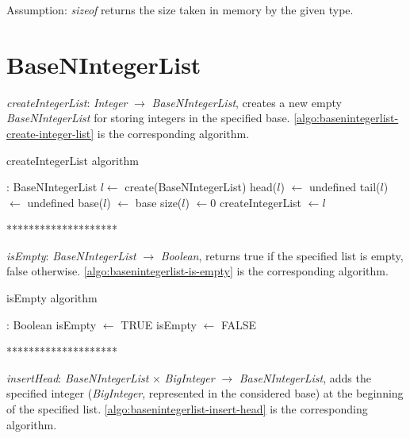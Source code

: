 \documentclass[book, nodocumentinfo]{upmethodology-document}
\newcommand{\separator}{\centerline{********************}}
\begin{document}
Assumption: \emph{sizeof} returns the size taken in memory by the given type.

\section{BaseNIntegerList}

\emph{createIntegerList}: \emph{Integer} \(\rightarrow\) \emph{BaseNIntegerList},
    creates a new empty \emph{BaseNIntegerList} for storing integers in the specified base.
    \ref{algo:basenintegerlist-create-integer-list} is the corresponding algorithm.

\begin{algorithm}[H]
    \caption{createIntegerList algorithm}
    \label{algo:basenintegerlist-create-integer-list}

    \begin{algorithmic}
         : BaseNIntegerList
            \State \(l \leftarrow\) create(BaseNIntegerList)
            \State head(\(l\)) \(\leftarrow\) undefined
            \State tail(\(l\)) \(\leftarrow\) undefined
            \State base(\(l\)) \(\leftarrow\) base
            \State size(\(l\)) \(\leftarrow 0\)
            \State createIntegerList \(\leftarrow l\)
        \EndFunction
    \end{algorithmic}
\end{algorithm}

\separator

\emph{isEmpty}: \emph{BaseNIntegerList} \(\rightarrow\) \emph{Boolean},
returns true if the specified list is empty, false otherwise.
\ref{algo:basenintegerlist-is-empty} is the corresponding algorithm.

\begin{algorithm}[H]
    \caption{isEmpty algorithm}
    \label{algo:basenintegerlist-is-empty}

    \begin{algorithmic}
         : Boolean
                \State isEmpty \(\leftarrow\) TRUE
            \Else
                \State isEmpty \(\leftarrow\) FALSE
            \EndIf
        \EndFunction
    \end{algorithmic}
\end{algorithm}

\separator

\emph{insertHead}: \emph{BaseNIntegerList} \(×\) \emph{BigInteger} \(\rightarrow\) \emph{BaseNIntegerList},
adds the specified integer (\emph{BigInteger}, represented in the considered base) at the beginning
of the specified list.
\ref{algo:basenintegerlist-insert-head} is the corresponding algorithm.
\end{document}
